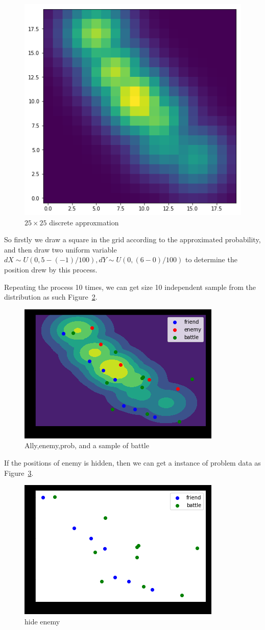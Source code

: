 \documentclass{article}
\begin{document}
\begin{figure}[h]
\includegraphics[width=0.6\linewidth]{gridify.png}
\caption{$25 \times 25$ discrete approxmation}
\label{fig:gridify}
\end{figure}

So firstly we draw a square in the grid according to the approximated probability, 
and then draw two uniform variable $dX \sim U(0,5-(-1)/100),dY \sim U(0,(6-0)/100)$ 
to determine the position drew by this process.

Repeating the process 10 times, 
we can get size 10 independent sample from the distribution as such Figure~\ref{fig:stateSampleBattle}.

\begin{figure}[h]
\includegraphics[width=0.6\linewidth]{state_sample_battle.png}
\caption{Ally,enemy,prob, and a sample of battle}
\label{fig:stateSampleBattle}
\end{figure}

If the positions of enemy is hidden, 
then we can get a instance of problem data as Figure~\ref{fig:stateNoEnemy}.

\begin{figure}[h]
\includegraphics[width=0.6\linewidth]{state_no_enemy.png}
\caption{hide enemy}
\label{fig:stateNoEnemy}
\end{figure}
\end{document}
